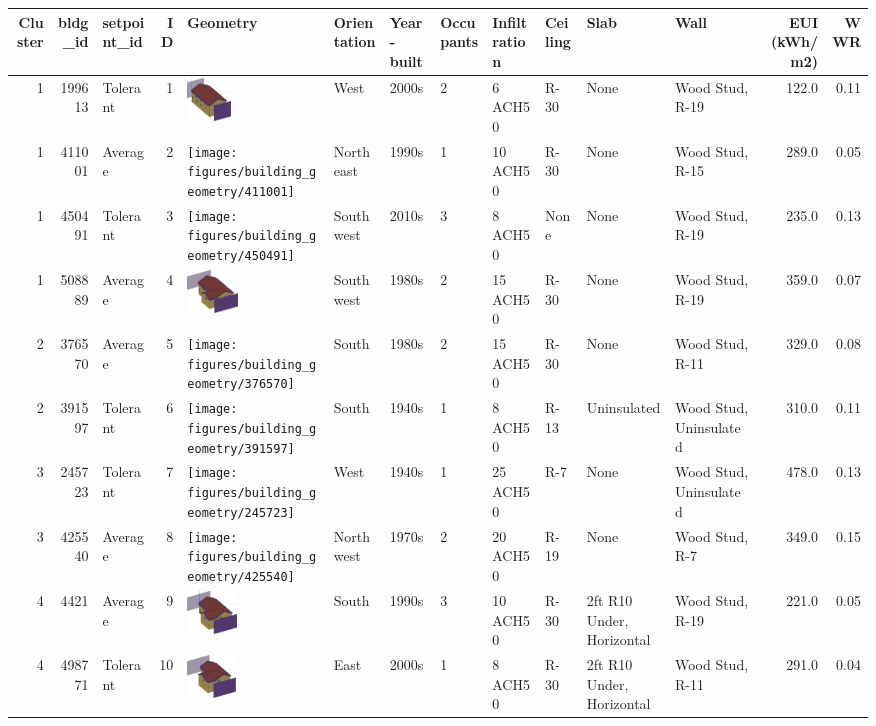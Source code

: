 \begin{tabular}{rrlrllllllllrr}
\toprule
 Cluster & bldg_id & setpoint_id & ID & Geometry & Orientation & Year-built & Occupants & Infiltration & Ceiling & Slab & Wall & EUI (kWh/m2) & WWR \\
\midrule
 1 & 199613 & Tolerant & 1 & {\includegraphics[height=0.45in]{figures/building_geometry/199613}} & West & 2000s & 2 & 6 ACH50 & R-30 & None & Wood Stud, R-19 & 122.0 & 0.11 \\
 1 & 411001 & Average & 2 & {\texttt{[image: figures/building\_geometry/411001]}} & Northeast & 1990s & 1 & 10 ACH50 & R-30 & None & Wood Stud, R-15 & 289.0 & 0.05 \\
 1 & 450491 & Tolerant & 3 & {\texttt{[image: figures/building\_geometry/450491]}} & Southwest & 2010s & 3 & 8 ACH50 & None & None & Wood Stud, R-19 & 235.0 & 0.13 \\
 1 & 508889 & Average & 4 & {\includegraphics[height=0.45in]{figures/building_geometry/508889}} & Southwest & 1980s & 2 & 15 ACH50 & R-30 & None & Wood Stud, R-19 & 359.0 & 0.07 \\
 2 & 376570 & Average & 5 & {\texttt{[image: figures/building\_geometry/376570]}} & South & 1980s & 2 & 15 ACH50 & R-30 & None & Wood Stud, R-11 & 329.0 & 0.08 \\
 2 & 391597 & Tolerant & 6 & {\texttt{[image: figures/building\_geometry/391597]}} & South & 1940s & 1 & 8 ACH50 & R-13 & Uninsulated & Wood Stud, Uninsulated & 310.0 & 0.11 \\
 3 & 245723 & Tolerant & 7 & {\texttt{[image: figures/building\_geometry/245723]}} & West & 1940s & 1 & 25 ACH50 & R-7 & None & Wood Stud, Uninsulated & 478.0 & 0.13 \\
 3 & 425540 & Average & 8 & {\texttt{[image: figures/building\_geometry/425540]}} & Northwest & 1970s & 2 & 20 ACH50 & R-19 & None & Wood Stud, R-7 & 349.0 & 0.15 \\
 4 & 4421 & Average & 9 & {\includegraphics[height=0.45in]{figures/building_geometry/4421}} & South & 1990s & 3 & 10 ACH50 & R-30 & 2ft R10 Under, Horizontal & Wood Stud, R-19 & 221.0 & 0.05 \\
 4 & 498771 & Tolerant & 10 & {\includegraphics[height=0.45in]{figures/building_geometry/498771}} & East & 2000s & 1 & 8 ACH50 & R-30 & 2ft R10 Under, Horizontal & Wood Stud, R-11 & 291.0 & 0.04 \\
\bottomrule
\end{tabular}
